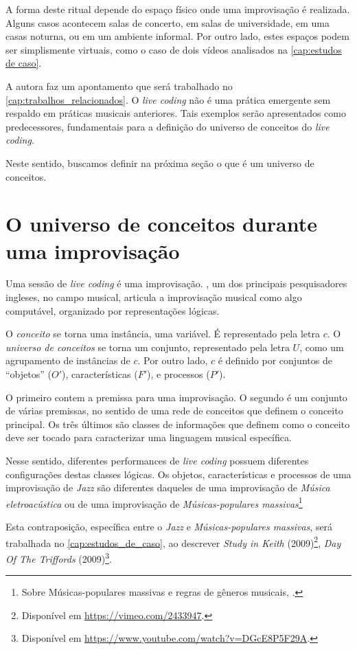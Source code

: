  A forma deste ritual depende do espaço físico onde uma improvisação é realizada. Alguns casos acontecem salas de concerto, em salas de universidade, em uma casas noturna, ou em um ambiente informal. Por outro lado, estes espaços podem ser simplismente virtuais, como o caso de dois vídeos analisados na \autoref{cap:estudos de caso}. 

A autora faz um apontamento que será trabalhado no \autoref{cap:trabalhos_relacionados}. O \emph{live coding} não é uma prática emergente sem respaldo em práticas musicais anteriores. Tais exemplos serão apresentados como predecessores, fundamentais para a definição do universo de conceitos do \emph{live coding}. 

Neste sentido, buscamos definir na próxima seção o que é um universo de conceitos.

\section{O universo de conceitos durante uma improvisação}\label{sec:universo}

Uma sessão de \emph{live coding} é uma improvisação. , um dos principais pesquisadores ingleses, no campo musical, articula a improvisação musical como algo computável, organizado por representações lógicas. 

O \emph{conceito} se torna uma instância, uma variável. É representado pela letra $c$. O  \emph{universo de conceitos} se torna um conjunto, representado pela letra $U$, como um agrupamento de instâncias de $c$. Por outro lado, $c$ é definido por conjuntos de ``objetos'' ($O'$), características ($F'$), e processos ($P'$). 

O primeiro contem a premissa para uma improvisação. O segundo é um conjunto de várias premissas, no sentido de uma rede de conceitos que definem o conceito principal. Os três últimos são classes de informações que definem como o conceito deve ser tocado para caracterizar uma linguagem musical específica.

Nesse sentido, diferentes performances de \emph{live coding} possuem diferentes configurações destas classes lógicas. Os objetos, características e processos de uma improvisação de \emph{Jazz} são diferentes daqueles de uma improvisação de \emph{Música eletroacústica} ou de uma improvisação de \emph{Músicas-populares massivas}\footnote{Sobre Músicas-populares massivas e regras de gêneros musicais, .}

Esta contraposição, específica entre o \emph{Jazz} e \emph{Músicas-populares massivas}, será trabalhada no \autoref{cap:estudos_de_caso}, ao descrever \emph{Study in Keith} (2009)\footnote{Disponível em \url{https://vimeo.com/2433947}.}, \emph{Day Of The Triffords} (2009)\footnote{Disponível em \url{https://www.youtube.com/watch?v=DGcE8P5F29A}.}.


